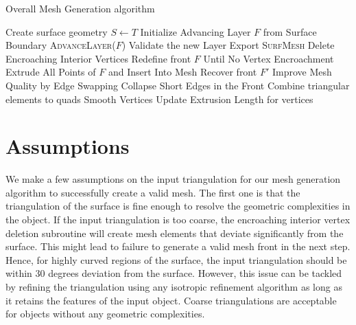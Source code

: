 \begin{algorithm}[hbt!]
\caption{Overall Mesh Generation algorithm}\label{alg:euclid}
\begin{algorithmic}[1]
\State Create surface geometry $S \gets T$
\State Initialize Advancing Layer $F$ from Surface Boundary
\State \textsc{AdvanceLayer($F$)}
\State Validate the new Layer
\EndWhile \label{advancing-layer-routine}
\State Export \textsc{SurfMesh}
\EndProcedure
{}
\State Delete Encroaching Interior Vertices
\State Redefine front $F$ Until No Vertex Encroachment 
\State Extrude All Points of $F$ and Insert Into Mesh
\State Recover front $F'$ 
\State Improve Mesh Quality by Edge Swapping 
\State Collapse Short Edges in the Front
\State Combine triangular elements to quads
\State Smooth Vertices
\State Update Extrusion Length for vertices
\EndProcedure
\end{algorithmic}
\label{algo}
\end{algorithm}

\section{Assumptions}

We make a few assumptions on the input triangulation for our mesh generation algorithm to successfully create a valid mesh. The first one is that the triangulation of the surface is fine enough to resolve the geometric complexities in the object. If the input triangulation is too coarse, the encroaching interior vertex deletion subroutine will create mesh elements that deviate significantly from the surface. This might lead to failure to generate a valid mesh front in the next step. Hence, for highly curved regions of the surface, the input triangulation should be within 30 degrees deviation from the surface. However, this issue can be tackled by refining the triangulation using any isotropic refinement algorithm as long as it retains the features of the input object. Coarse triangulations are acceptable for objects without any geometric complexities.


